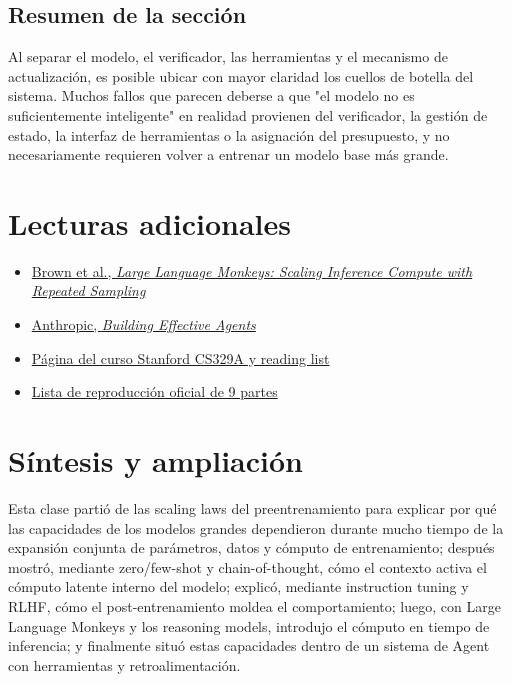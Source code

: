 \documentclass[a4paper]{article}
\begin{document}
\subsection{Resumen de la sección}

Al separar el modelo, el verificador, las herramientas y el mecanismo de actualización, es posible ubicar con mayor claridad los cuellos de botella del sistema. Muchos fallos que parecen deberse a que "el modelo no es suficientemente inteligente" en realidad provienen del verificador, la gestión de estado, la interfaz de herramientas o la asignación del presupuesto, y no necesariamente requieren volver a entrenar un modelo base más grande.

\section{Lecturas adicionales}

\begin{itemize}
    \item \href{https://arxiv.org/abs/2407.21787}{Brown et al., \emph{Large Language Monkeys: Scaling Inference Compute with Repeated Sampling}}
    \item \href{https://www.anthropic.com/research/building-effective-agents}{Anthropic, \emph{Building Effective Agents}}
    \item \href{https://cs329a.stanford.edu/}{Página del curso Stanford CS329A y reading list}
    \item \href{https://www.youtube.com/playlist?list=PLangBM27OtEA}{Lista de reproducción oficial de 9 partes}
\end{itemize}

\section{Síntesis y ampliación}

Esta clase partió de las scaling laws del preentrenamiento para explicar por qué las capacidades de los modelos grandes dependieron durante mucho tiempo de la expansión conjunta de parámetros, datos y cómputo de entrenamiento; después mostró, mediante zero/few-shot y chain-of-thought, cómo el contexto activa el cómputo latente interno del modelo; explicó, mediante instruction tuning y RLHF, cómo el post-entrenamiento moldea el comportamiento; luego, con Large Language Monkeys y los reasoning models, introdujo el cómputo en tiempo de inferencia; y finalmente situó estas capacidades dentro de un sistema de Agent con herramientas y retroalimentación.
\end{document}
